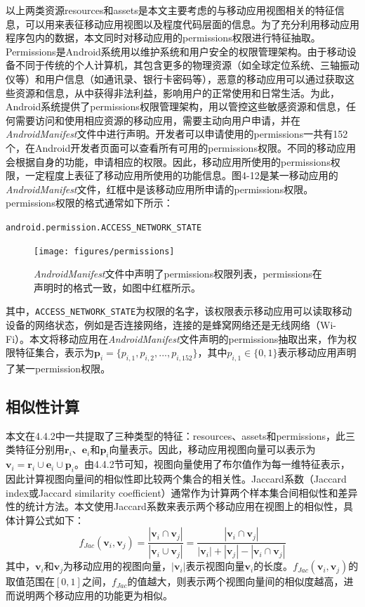 以上两类资源resources和assets是本文主要考虑的与移动应用视图相关的特征信息，可以用来表征移动应用视图以及程度代码层面的信息。为了充分利用移动应用程序包内的数据，本文同时对移动应用的permissions权限进行特征抽取。Permissions\cite{permission}是Android系统用以维护系统和用户安全的权限管理架构。由于移动设备不同于传统的个人计算机，其包含更多的物理资源（如全球定位系统、三轴振动仪等）和用户信息（如通讯录、银行卡密码等），恶意的移动应用可以通过获取这些资源和信息，从中获得非法利益，影响用户的正常使用和日常生活。为此，Android系统提供了permissions权限管理架构，用以管控这些敏感资源和信息，任何需要访问和使用相应资源的移动应用，需要主动向用户申请，并在\textit{AndroidManifest}文件中进行声明。开发者可以申请使用的permissions一共有152个，在Android开发者页面\cite{permission}可以查看所有可用的permissions权限。不同的移动应用会根据自身的功能，申请相应的权限。因此，移动应用所使用的permissions权限，一定程度上表征了移动应用所使用的功能信息。图4-12是某一移动应用的\textit{AndroidManifest}文件，红框中是该移动应用所申请的permissions权限。permissions权限的格式通常如下所示：
\begin{center}
\texttt{android.permission.ACCESS\_NETWORK\_STATE}
\end{center}
\begin{figure}
	\centering
	\texttt{[image: figures/permissions]}
	\caption{\textit{AndroidManifest}文件中声明了permissions权限列表，permissions在声明时的格式一致，如图中红框所示。}
\end{figure}
其中，\texttt{ACCESS\_NETWORK\_STATE}为权限的名字，该权限表示移动应用可以读取移动设备的网络状态，例如是否连接网络，连接的是蜂窝网络还是无线网络（Wi-Fi）。本文将移动应用在\textit{AndroidManifest}文件声明的permissions抽取出来，作为权限特征集合，表示为$\textbf{p}_i = \{p_{i,1}, p_{i,2}, ..., p_{i,152}\}$，其中$p_{i,1} \in \{0, 1\}$表示移动应用声明了某一permission权限。


\subsection{相似性计算}
本文在4.4.2中一共提取了三种类型的特征：resources、assets和permissions，此三类特征分别用$\textbf{r}_i$、$\textbf{e}_i$和$\textbf{p}_i$向量表示。因此，移动应用视图向量可以表示为$\textbf{v}_i = \textbf{r}_i \cup \textbf{e}_i \cup \textbf{p}_i$。由4.4.2节可知，视图向量使用了布尔值作为每一维特征表示，因此计算视图向量间的相似性即比较两个集合的相关性。Jaccard系数（Jaccard index或Jaccard similarity coefficient）通常作为计算两个样本集合间相似性和差异性的统计方法。本文使用Jaccard系数来表示两个移动应用在视图上的相似性，具体计算公式如下：
\begin{equation}
f_{\mathit{Jac}}(\textbf{v}_i, \textbf{v}_j) 
= \frac{| \textbf{v}_i \cap \textbf{v}_j |}{| \textbf{v}_i \cup \textbf{v}_j |}
= \frac{| \textbf{v}_i \cap \textbf{v}_j |}{| \textbf{v}_i | + | \textbf{v}_j | - | \textbf{v}_i \cap \textbf{v}_j |}
\end{equation}
其中，$\textbf{v}_i$和$\textbf{v}_j$为移动应用的视图向量，$|\textbf{v}_i|$表示视图向量$\textbf{v}_i$的长度。$f_{\mathit{Jac}}(\textbf{v}_i, \textbf{v}_j)$的取值范围在$[0,1]$之间，$f_{\mathit{Jac}}$的值越大，则表示两个视图向量间的相似度越高，进而说明两个移动应用的功能更为相似。

